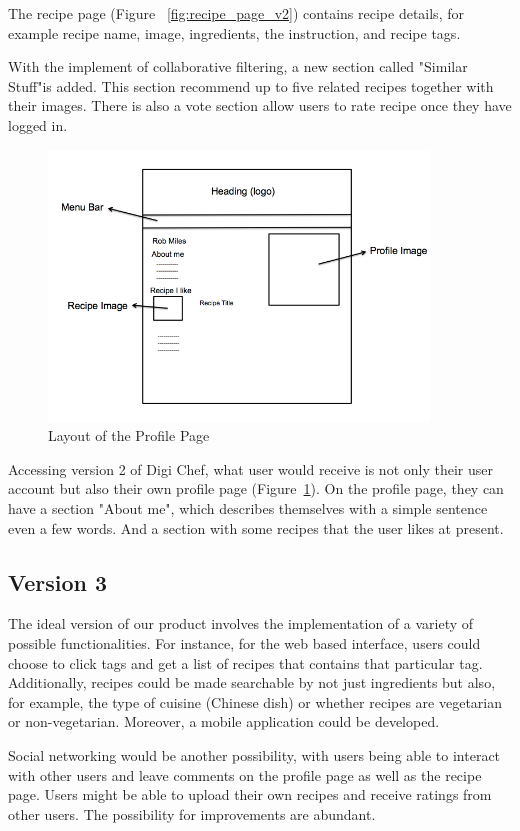 The recipe page (Figure~ \ref{fig:recipe_page_v2}) contains recipe details, for example recipe name, image, ingredients, the instruction, and recipe tags.
 
 With the implement of collaborative filtering, a new section called "Similar Stuff"is added. This section recommend up to five related recipes together with their images. There is also a vote section allow users to rate recipe once they have logged in.
 
 \begin{figure}[H]
\includegraphics[width=0.9\textwidth]{profile_page_v2}
\caption{Layout of the Profile Page}
\label{fig:profile_page_v2}
\end{figure}

Accessing version 2 of Digi Chef, what user would receive is not only their user account but also their own profile page (Figure~\ref{fig:profile_page_v2}). On the profile page, they can have a section "About me", which describes themselves with a simple sentence even a few words. And a section with some recipes that the user likes at present.

\subsection{Version 3}
The ideal version of our product involves the implementation of a variety of possible functionalities. For instance, for the web based interface, users could choose to click tags and get a list of recipes that contains that particular tag. Additionally, recipes could be made searchable by not just ingredients but also, for example, the type of cuisine (Chinese dish) or whether recipes are vegetarian or non-vegetarian. Moreover, a mobile application could be developed. 

Social networking would be another possibility, with users being able to interact with other users and leave comments on the profile page as well as the recipe page. Users might be able to upload their own recipes and receive ratings from other users. The possibility for improvements are abundant.


